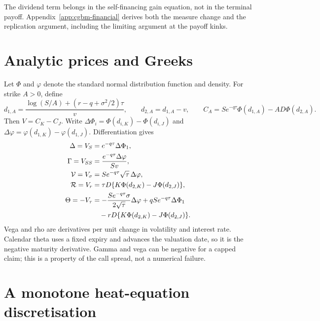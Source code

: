 \documentclass[11pt]{article}
\begin{document}
The dividend term belongs in the self-financing gain equation, not in
the terminal payoff. Appendix~\ref{app:cgbm-financial} derives both the
measure change and the replication argument, including the limiting
argument at the payoff kinks.

\section{Analytic prices and Greeks}
\label{sec:cgbm-analytic}

Let $\Phi$ and $\varphi$ denote the standard normal distribution function
and density. For strike $A>0$, define
\begin{equation}
 d_{1,A}=\frac{\log(S/A)+(r-q+\sigma^2/2)\tau}{v},
 \qquad d_{2,A}=d_{1,A}-v,
 \qquad C_A=S e^{-q\tau}\Phi(d_{1,A})-A D\Phi(d_{2,A}).
 \label{eq:cgbm-call}
\end{equation}
Then $V=C_K-C_J$. Write
$\Delta\Phi_i=\Phi(d_{i,K})-\Phi(d_{i,J})$ and
$\Delta\varphi=\varphi(d_{1,K})-\varphi(d_{1,J})$. Differentiation gives
\begin{align}
 \Delta=V_S&=e^{-q\tau}\Delta\Phi_1,\label{eq:cgbm-delta}\\
 \Gamma=V_{SS}&=\frac{e^{-q\tau}\Delta\varphi}{Sv},\label{eq:cgbm-delta-gamma}\\
 \mathcal V=V_\sigma&=S e^{-q\tau}\sqrt{\tau}\,\Delta\varphi,\label{eq:cgbm-vega}\\
 \mathcal R=V_r&=\tau D\{K\Phi(d_{2,K})-J\Phi(d_{2,J})\},\label{eq:cgbm-vega-rho}\\
 \Theta=-V_\tau&=-\frac{S e^{-q\tau}\sigma}{2\sqrt{\tau}}\Delta\varphi
 +q S e^{-q\tau}\Delta\Phi_1\notag\\
 &\quad-rD\{K\Phi(d_{2,K})-J\Phi(d_{2,J})\}.\label{eq:cgbm-theta}
\end{align}
Vega and rho are derivatives per unit change in volatility and interest
rate. Calendar theta uses a fixed expiry and advances the valuation date,
so it is the negative maturity derivative. Gamma and vega can be negative
for a capped claim; this is a property of the call spread, not a numerical
failure.

\section{A monotone heat-equation discretisation}
\label{sec:cgbm-heat}
\end{document}
